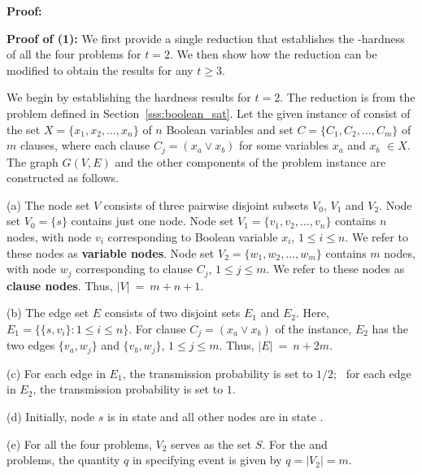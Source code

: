 \noindent
\textbf{Proof:}~ 

\noindent
\textbf{Proof of (1):} We first provide a single reduction that establishes the
\cnump-hardness of all the four problems for $t = 2$.
We then show how the reduction can be modified to obtain the results 
for any $t \geq 3$.

\medskip
We begin by establishing the hardness results for $t = 2$. 
The reduction is from the \mtsat{} problem defined in 
Section~\ref{sss:boolean_sat}.
Let the given instance of \mtsat{} consist of the
set $X = \{x_1, x_2, \ldots, x_n\}$ of $n$ Boolean variables and
set $C = \{C_1, C_2, \ldots, C_m\}$ of $m$ clauses, 
where each clause $C_j = (x_a \vee x_b)$ for some variables $x_a$ and
$x_b$ $\in X$.
The graph $G(V,E)$ and the other components of the \TwoNewInfs{} 
problem instance are constructed as follows.
\begin{description}
\item{(a)} The node set $V$ consists of three pairwise disjoint subsets
$V_0$, $V_1$ and $V_2$.
Node set $V_0 = \{s\}$ contains just one node.
Node set $V_1 = \{v_1, v_2, \ldots, v_n\}$ contains $n$ nodes, 
with node $v_i$ corresponding to Boolean variable $x_i$, $1 \leq i \leq n$. 
We refer to these nodes as {\bf variable nodes}.
Node set $V_2 = \{w_1, w_2, \ldots, w_m\}$ contains $m$ nodes, 
with node $w_j$ corresponding to clause $C_j$, $1 \leq j \leq m$. 
We refer to these nodes as {\bf clause nodes}.
Thus, $|V| ~=~ m+n+1$.

\item{(b)} The edge set $E$ consists of two disjoint sets $E_1$ and $E_2$.
Here, $E_1 = \{\{s, v_i\}: 1 \leq i \leq n\}$.
For clause $C_j = (x_a \vee x_b)$ of the \mtsat{} instance,
$E_2$ has the two edges $\{v_a, w_j\}$ and
$\{v_b, w_j\}$, $1 \leq j \leq m$.
Thus, $|E| ~=~ n+2m$. 

\item{(c)} 
For each edge in $E_1$, the transmission probability is set to $1/2$;~ 
for each edge in $E_2$, the transmission probability is set to $1$. 

\item{(d)} Initially, node $s$ is in state \istate{} and all
other nodes are in state \sstate.

\item{(e)} For all the four problems, $V_2$ serves 
as the set $S$. 
For the \TwoNewInfs{} and \\
\TwoTotInfs{} problems, the quantity $q$ in specifying 
event \cale{} is given by $q = |V_2| = m$.
\end{description}

